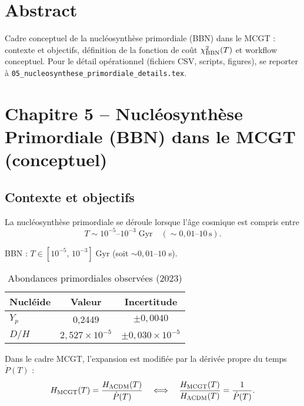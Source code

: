 \section*{Abstract}
Cadre conceptuel de la nucléosynthèse primordiale (BBN) dans le MCGT : contexte et objectifs, définition de la fonction de coût \(\chi^2_{\rm BBN}(T)\) et workflow conceptuel.
Pour le détail opérationnel (fichiers CSV, scripts, figures), se reporter à \texttt{05\_nucleosynthese\_primordiale\_details.tex}.

\vspace{1em}
\section{Chapitre 5 – Nucléosynthèse Primordiale (BBN) dans le MCGT (conceptuel)}

\subsection{Contexte et objectifs}

La nucléosynthèse primordiale se déroule lorsque l’âge cosmique est compris entre
\[
  T \sim 10^{-5}\text{–}10^{-3}\;\mathrm{Gyr}
  \quad(\sim0{,}01\text{–}10\,\mathrm{s}).
\]

\begin{tcolorbox}[colback=gray!10,colframe=black,title=Fenêtre temporelle critique]
BBN : \(T\in[10^{-5},\,10^{-3}]\;\mathrm{Gyr}\)
(soit \(\sim0{,}01\)–\(10\) s).
\end{tcolorbox}

\begin{table}[htbp]
  \centering
  \caption{Abondances primordiales observées (2023)}
  \begin{tabular}{lcc}
    \toprule
    Nucléide & Valeur & Incertitude \\
    \midrule
    \(Y_{p}\) & 0,2449 & \(\pm0,0040\) \\
    \(D/H\)   & \(2,527\times10^{-5}\) & \(\pm0,030\times10^{-5}\) \\
    \bottomrule
  \end{tabular}
\end{table}

Dans le cadre MCGT, l’expansion est modifiée par la dérivée propre du temps \(\dot P(T)\) :
\[
  H_{\rm MCGT}(T)
  = \frac{H_{\Lambda\mathrm{CDM}}(T)}{\dot P(T)}
  \quad\Longleftrightarrow\quad
  \frac{H_{\rm MCGT}(T)}{H_{\Lambda\mathrm{CDM}}(T)}
  = \frac{1}{\dot P(T)}.
\]


